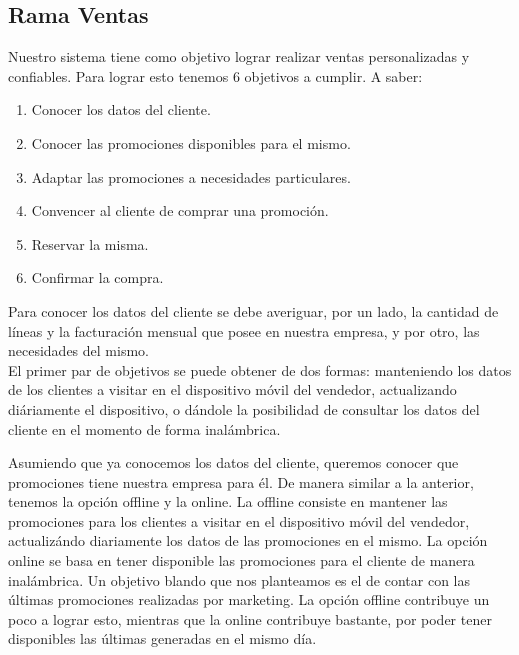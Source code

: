 \clearpage

\subsection{Rama Ventas}

Nuestro sistema tiene como objetivo lograr realizar ventas personalizadas y confiables. Para lograr esto tenemos 6 objetivos a cumplir. A saber:
\begin{enumerate}
  \item Conocer los datos del cliente.
  \item Conocer las promociones disponibles para el mismo.
  \item Adaptar las promociones a necesidades particulares.
  \item Convencer al cliente de comprar una promoción.
  \item Reservar la misma.
  \item Confirmar la compra.
\end{enumerate}

\indent Para conocer los datos del cliente se debe averiguar, por un lado, la cantidad de líneas y la facturación mensual que posee en nuestra empresa, y por otro, las necesidades del mismo.\\
\indent El primer par de objetivos se puede obtener de dos formas: manteniendo los datos de los clientes a visitar en el dispositivo móvil del vendedor, actualizando diáriamente el dispositivo, o dándole la posibilidad de consultar los datos del cliente en el momento de forma inalámbrica.

\indent Asumiendo que ya conocemos los datos del cliente, queremos conocer que promociones tiene nuestra empresa para él. De manera similar a la anterior, tenemos la opción offline y la online. La offline consiste en mantener las promociones para los clientes a visitar en el dispositivo móvil del vendedor, actualizándo diariamente los datos de las promociones en el mismo. La opción online se basa en tener disponible las promociones para el cliente de manera inalámbrica. Un objetivo blando que nos planteamos es el de contar con las últimas promociones realizadas por marketing. La opción offline contribuye un poco a lograr esto, mientras que la online contribuye bastante, por poder tener disponibles las últimas generadas en el mismo día.\\
\\

